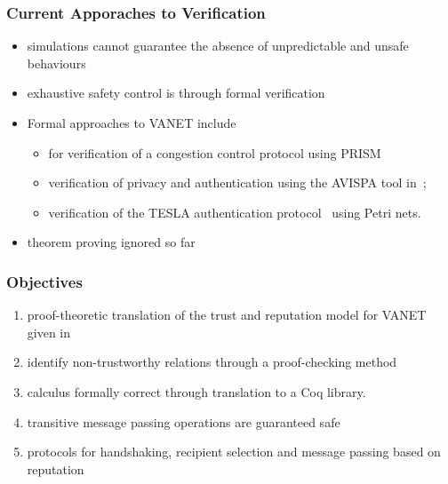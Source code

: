 \documentclass{beamer}
\begin{document}
\begin{frame}
	\label{error2}
	\frametitle{Current Apporaches to Verification}
	\smallskip

\begin{itemize}
\item simulations cannot guarantee the absence of unpredictable and unsafe behaviours
\item exhaustive safety control is through formal verification
\item Formal approaches to VANET include
\begin{itemize}
\item \cite{DBLP:conf/vtc/KonurF11} for verification of a congestion control protocol using PRISM
\item verification of privacy and authentication using the AVISPA tool in~\cite{bouassida2011authentication};
\item verification of the TESLA authentication protocol~\cite{tesla-cpn} using Petri nets.
\end{itemize}
\item theorem proving ignored so far
\end{itemize}
%
\end{frame}

\begin{frame}
	\label{error2.1}
	\frametitle{Objectives}
	\smallskip
\begin{enumerate}
\item proof-theoretic translation of the trust and reputation model for VANET given in \cite{glenford}
\item identify non-trustworthy relations through a proof-checking method
\item calculus formally correct through translation to a Coq library.
\item transitive message passing operations are guaranteed safe
\item protocols for handshaking, recipient selection and message passing based on reputation
\end{enumerate}

\end{frame}
\end{document}
